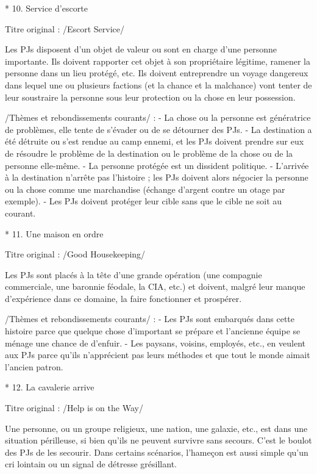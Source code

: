 \begin{enumerate}
* 10. Service d'escorte

Titre original : /Escort Service/

Les PJs disposent d'un objet de valeur ou sont en charge d'une personne importante. Ils doivent rapporter cet objet à son propriétaire légitime, ramener la personne dans un lieu protégé, etc. Ils doivent entreprendre un voyage dangereux dans lequel une ou plusieurs factions (et la chance et la malchance) vont tenter de leur soustraire la personne sous leur protection ou la chose en leur possession.

/Thèmes et rebondissements courants/ :
- La chose ou la personne est génératrice de problèmes, elle tente de s'évader ou de se détourner des PJs.
- La destination a été détruite ou s'est rendue au camp ennemi, et les PJs doivent prendre sur eux de résoudre le problème de la destination ou le problème de la chose ou de la personne elle-même.
- La personne protégée est un dissident politique.
- L'arrivée à la destination n'arrête pas l'histoire ; les PJs doivent alors négocier la personne ou la chose comme une marchandise (échange d'argent contre un otage par exemple).
- Les PJs doivent protéger leur cible sans que le cible ne soit au courant.

* 11. Une maison en ordre

Titre original : /Good Housekeeping/

Les PJs sont placés à la tête d'une grande opération (une compagnie commerciale, une baronnie féodale, la CIA, etc.) et doivent, malgré leur manque d'expérience dans ce domaine, la faire fonctionner et prospérer.

/Thèmes et rebondissements courants/ :
- Les PJs sont embarqués dans cette histoire parce que quelque chose d'important se prépare et l'ancienne équipe se ménage une chance de d'enfuir.
- Les paysans, voisins, employés, etc., en veulent aux PJs parce qu'ils n'apprécient pas leurs méthodes et que tout le monde aimait l'ancien patron.

* 12. La cavalerie arrive

Titre original : /Help is on the Way/

Une personne, ou un groupe religieux, une nation, une galaxie, etc., est dans une situation périlleuse, si bien qu'ils ne peuvent survivre sans secours. C'est le boulot des PJs de les secourir. Dans certains scénarios, l'hameçon est aussi simple qu'un cri lointain ou un signal de détresse grésillant.


\end{enumerate}

